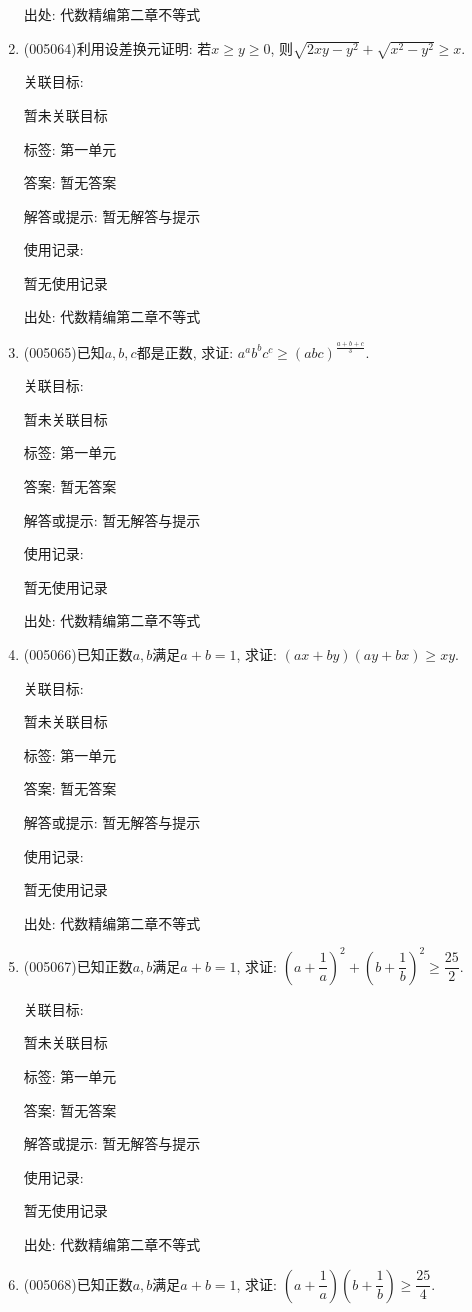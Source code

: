 \documentclass[10pt,a4paper]{article}
\begin{document}
\begin{enumerate}[1.]
出处: 代数精编第二章不等式
\item { (005064)}利用设差换元证明: 若$x\ge y\ge 0$, 则$\sqrt{2xy-{y^2}}+\sqrt{x^2-y^2}\ge x$.


关联目标:

暂未关联目标



标签: 第一单元

答案: 暂无答案

解答或提示: 暂无解答与提示

使用记录:

暂无使用记录


出处: 代数精编第二章不等式
\item { (005065)}已知$a,b,c$都是正数, 求证: $a^ab^bc^c\ge (abc)^{\frac{a+b+c}3}$.


关联目标:

暂未关联目标



标签: 第一单元

答案: 暂无答案

解答或提示: 暂无解答与提示

使用记录:

暂无使用记录


出处: 代数精编第二章不等式
\item { (005066)}已知正数$a,b$满足$a+b=1$, 求证: $(ax+by)(ay+bx)\ge xy$.


关联目标:

暂未关联目标



标签: 第一单元

答案: 暂无答案

解答或提示: 暂无解答与提示

使用记录:

暂无使用记录


出处: 代数精编第二章不等式
\item { (005067)}已知正数$a,b$满足$a+b=1$, 求证: $(a+\dfrac 1a)^2+(b+\dfrac 1b)^2\ge \dfrac{25}2$.


关联目标:

暂未关联目标



标签: 第一单元

答案: 暂无答案

解答或提示: 暂无解答与提示

使用记录:

暂无使用记录


出处: 代数精编第二章不等式
\item { (005068)}已知正数$a,b$满足$a+b=1$, 求证: $(a+\dfrac 1a)(b+\dfrac 1b)\ge \dfrac{25}4$.



\end{enumerate}
\end{document}
